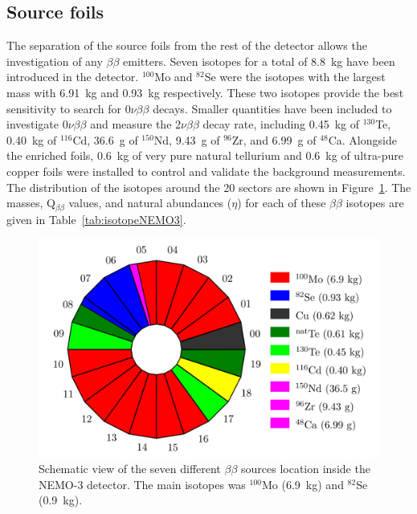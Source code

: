 \documentclass[main.tex]{subfiles}
\begin{document}
\FloatBarrier


\subsection{Source foils}


\NI The separation of the source foils from the rest of the detector allows the investigation of any $\beta\beta$ emitters. Seven isotopes for a total of 8.8~kg have been introduced in the detector. $^{\text{100}}$Mo and $^{\text{82}}$Se were the isotopes with the largest mass with 6.91~kg and 0.93~kg respectively. These two isotopes provide the best sensitivity to search for 0$\nu\beta\beta$ decays. Smaller quantities have been included to investigate 0$\nu\beta\beta$ and measure the 2$\nu\beta\beta$ decay rate, including 0.45~kg of $^{\text{130}}$Te, 0.40~kg of $^{\text{116}}$Cd, 36.6~g of $^{\text{150}}$Nd, 9.43~g of $^{\text{96}}$Zr, and 6.99~g of $^{\text{48}}$Ca. Alongside the enriched foils, 0.6~kg of very pure natural tellurium and 0.6~kg of ultra-pure copper foils were installed to control and validate the background measurements. The distribution of the isotopes around the 20 sectors are shown in Figure~\ref{NEMO3Sector}. The masses, Q$_{\beta\beta}$ values, and natural abundances ($\eta$) for each of these $\beta\beta$ isotopes are given in Table~\ref{tab:isotopeNEMO3}.



\begin{figure}[h!]
\begin{center}
\includegraphics[scale=0.5]{pictures/Chap3/BBSourceDistribution.png}
\caption{Schematic view of the seven different $\beta\beta$ sources location inside the NEMO-3 detector. The main isotopes was $^{\text{100}}$Mo (6.9~kg) and $^{\text{82}}$Se (0.9~kg).}
\label{NEMO3Sector}
\end{center}
\end{figure}
\end{document}
